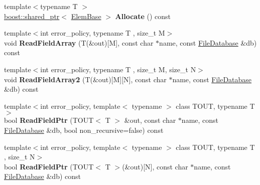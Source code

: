 \begin{DoxyCompactItemize}
\item 
\hypertarget{class_assimp_1_1_blender_1_1_structure_a3987edcd3aa649db235e452c2f857630}{{\footnotesize template$<$typename T $>$ }\\\hyperlink{classboost_1_1shared__ptr}{boost\+::shared\+\_\+ptr}$<$ \hyperlink{struct_assimp_1_1_blender_1_1_elem_base}{Elem\+Base} $>$ {\bfseries Allocate} () const }\label{class_assimp_1_1_blender_1_1_structure_a3987edcd3aa649db235e452c2f857630}

\item 
\hypertarget{class_assimp_1_1_blender_1_1_structure_a9e750fb9106de8f28c1cebcf62cf7e3a}{{\footnotesize template$<$int error\+\_\+policy, typename T , size\+\_\+t M$>$ }\\void {\bfseries Read\+Field\+Array} (T(\&out)\mbox{[}M\mbox{]}, const char $\ast$name, const \hyperlink{class_assimp_1_1_blender_1_1_file_database}{File\+Database} \&db) const }\label{class_assimp_1_1_blender_1_1_structure_a9e750fb9106de8f28c1cebcf62cf7e3a}

\item 
\hypertarget{class_assimp_1_1_blender_1_1_structure_aa4487a73ae23d08ec0a3ee3b82787540}{{\footnotesize template$<$int error\+\_\+policy, typename T , size\+\_\+t M, size\+\_\+t N$>$ }\\void {\bfseries Read\+Field\+Array2} (T(\&out)\mbox{[}M\mbox{]}\mbox{[}N\mbox{]}, const char $\ast$name, const \hyperlink{class_assimp_1_1_blender_1_1_file_database}{File\+Database} \&db) const }\label{class_assimp_1_1_blender_1_1_structure_aa4487a73ae23d08ec0a3ee3b82787540}

\item 
\hypertarget{class_assimp_1_1_blender_1_1_structure_afd8708ca8594f38544c9695a61e4cdbc}{{\footnotesize template$<$int error\+\_\+policy, template$<$ typename $>$ class T\+O\+U\+T, typename T $>$ }\\bool {\bfseries Read\+Field\+Ptr} (T\+O\+U\+T$<$ T $>$ \&out, const char $\ast$name, const \hyperlink{class_assimp_1_1_blender_1_1_file_database}{File\+Database} \&db, bool non\+\_\+recursive=false) const }\label{class_assimp_1_1_blender_1_1_structure_afd8708ca8594f38544c9695a61e4cdbc}

\item 
\hypertarget{class_assimp_1_1_blender_1_1_structure_a4b91b1f05613475916584b660550eff7}{{\footnotesize template$<$int error\+\_\+policy, template$<$ typename $>$ class T\+O\+U\+T, typename T , size\+\_\+t N$>$ }\\bool {\bfseries Read\+Field\+Ptr} (T\+O\+U\+T$<$ T $>$(\&out)\mbox{[}N\mbox{]}, const char $\ast$name, const \hyperlink{class_assimp_1_1_blender_1_1_file_database}{File\+Database} \&db) const }\label{class_assimp_1_1_blender_1_1_structure_a4b91b1f05613475916584b660550eff7}


\end{DoxyCompactItemize}
